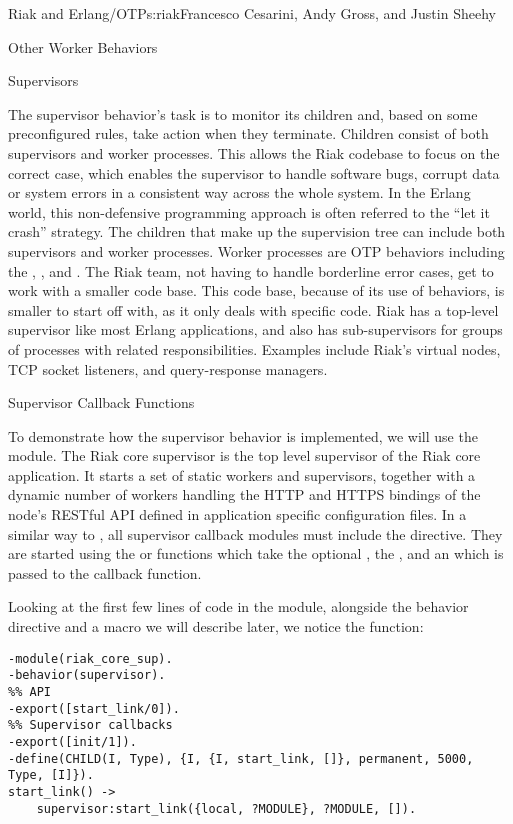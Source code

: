 \begin{aosachapter}{Riak and Erlang/OTP}{s:riak}{Francesco Cesarini, Andy Gross, and Justin Sheehy}
\begin{aosasect1}{Other Worker Behaviors}
\end{aosasect1}

\begin{aosasect1}{Supervisors}

The supervisor behavior's task is to monitor its children and, based
on some preconfigured rules, take action when they terminate. Children
consist of both supervisors and worker processes. This allows the Riak
codebase to focus on the correct case, which enables the supervisor to
handle software bugs, corrupt data or system errors in a consistent
way across the whole system. In the Erlang world, this non-defensive
programming approach is often referred to the ``let it crash''
strategy. The children that make up the supervision tree can include
both supervisors and worker processes. Worker processes are OTP
behaviors including the , , and
. The Riak team, not having to handle borderline
error cases, get to work with a smaller code base. This code base,
because of its use of behaviors, is smaller to start off with, as it
only deals with specific code. Riak has a top-level supervisor like
most Erlang applications, and also has sub-supervisors for groups
of processes with related responsibilities.  Examples include Riak's
virtual nodes, TCP socket listeners, and query-response managers.

\begin{aosasect2}{Supervisor Callback Functions}

To demonstrate how the supervisor behavior is implemented, we will use
the  module. The Riak core supervisor is the
top level supervisor of the Riak core application. It starts a set of
static workers and supervisors, together with a dynamic number of
workers handling the HTTP and HTTPS bindings of the node's RESTful API
defined in application specific configuration files. In a similar way
to , all supervisor callback modules must include
the  directive. They are started using
the  or  functions which take the
optional , the , and an
 which is passed to the  callback
function.

Looking at the first few lines of code in the
 module, alongside the behavior directive
and a macro we will describe later, we notice the 
function:

\begin{verbatim}
-module(riak_core_sup).
-behavior(supervisor).
%% API
-export([start_link/0]).
%% Supervisor callbacks
-export([init/1]).
-define(CHILD(I, Type), {I, {I, start_link, []}, permanent, 5000, Type, [I]}).
start_link() ->
    supervisor:start_link({local, ?MODULE}, ?MODULE, []).
\end{verbatim}


\end{aosasect2}
\end{aosasect1}
\end{aosachapter}
